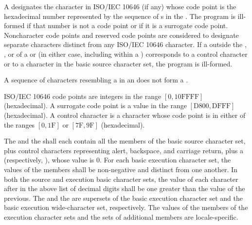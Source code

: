 A 
designates the character in ISO/IEC 10646 (if any)
whose code point is the hexadecimal number represented by
the sequence of s
in the .
The program is ill-formed if that number is not a code point
or if it is a surrogate code point.
Noncharacter code points and reserved code points
are considered to designate separate characters distinct from
any ISO/IEC 10646 character.
If a  outside
the , , or
 of
a  or 
(in either case, including within a )
corresponds to a control character or
to a character in the basic
source character set, the program is ill-formed.
\begin{footnote}
A sequence of characters resembling a  in an
 does not form a
.
\end{footnote}
\begin{note}
ISO/IEC 10646 code points are integers in the range $[0, \mathrm{10FFFF}]$ (hexadecimal).
A surrogate code point is a value in the range $[\mathrm{D800}, \mathrm{DFFF}]$ (hexadecimal).
A control character is a character whose code point is
in either of the ranges $[0, \mathrm{1F}]$ or $[\mathrm{7F}, \mathrm{9F}]$ (hexadecimal).
\end{note}

\pnum
The  and the
shall each contain all the members of the
basic source character set, plus control characters representing alert,
backspace, and carriage return, plus a 
(respectively, ), whose value is 0.
For each basic execution character set, the values of the
members shall be non-negative and distinct from one another. In both the
source and execution basic character sets, the value of each character
after  in the above list of decimal digits shall be one greater
than the value of the previous. The 
and the  are
supersets of the
basic execution character set and the basic execution wide-character
set, respectively. The values of the members of the execution character sets
and the sets of additional members
are locale-specific.%


